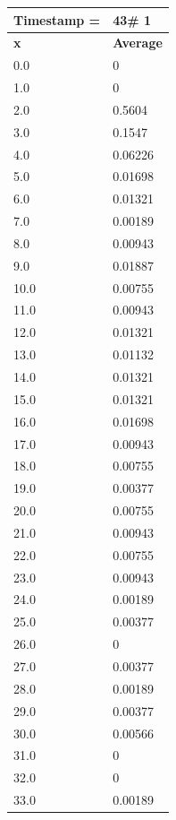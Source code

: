 \begin{tabular}{|l||l|}
\hline
\textbf{Timestamp =} & \textbf{43}\# 1\\\hline
	\textbf{x} & \textbf{Average} \\ \hline
\hline
	0.0 & 0 \\ \hline
	1.0 & 0 \\ \hline
	2.0 & 0.5604 \\ \hline
	3.0 & 0.1547 \\ \hline
	4.0 & 0.06226 \\ \hline
	5.0 & 0.01698 \\ \hline
	6.0 & 0.01321 \\ \hline
	7.0 & 0.00189 \\ \hline
	8.0 & 0.00943 \\ \hline
	9.0 & 0.01887 \\ \hline
	10.0 & 0.00755 \\ \hline
	11.0 & 0.00943 \\ \hline
	12.0 & 0.01321 \\ \hline
	13.0 & 0.01132 \\ \hline
	14.0 & 0.01321 \\ \hline
	15.0 & 0.01321 \\ \hline
	16.0 & 0.01698 \\ \hline
	17.0 & 0.00943 \\ \hline
	18.0 & 0.00755 \\ \hline
	19.0 & 0.00377 \\ \hline
	20.0 & 0.00755 \\ \hline
	21.0 & 0.00943 \\ \hline
	22.0 & 0.00755 \\ \hline
	23.0 & 0.00943 \\ \hline
	24.0 & 0.00189 \\ \hline
	25.0 & 0.00377 \\ \hline
	26.0 & 0 \\ \hline
	27.0 & 0.00377 \\ \hline
	28.0 & 0.00189 \\ \hline
	29.0 & 0.00377 \\ \hline
	30.0 & 0.00566 \\ \hline
	31.0 & 0 \\ \hline
	32.0 & 0 \\ \hline
	33.0 & 0.00189 \\ \hline
\end{tabular}


